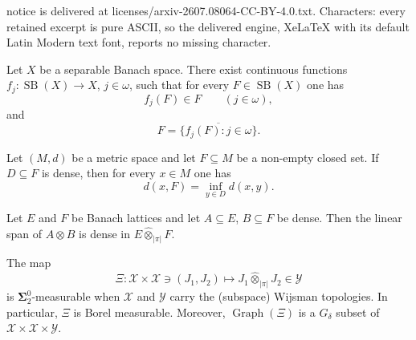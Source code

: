 \documentclass[10pt,a4paper]{amsart}
\DeclareMathOperator{\Graph}{Graph}
\DeclareMathOperator{\SB}{SB}
\begin{document}
notice is delivered at licenses/arxiv-2607.08064-CC-BY-4.0.txt. Characters: every retained excerpt is pure ASCII, so the delivered engine, XeLaTeX with its default Latin Modern text font, reports no missing character.
\begin{theorem}\label{thm:selection}
Let $X$ be a separable Banach space.  There exist continuous functions
$f_j \colon \SB(X) \to X$, $j \in \omega$, such that for every
$F \in \SB(X)$ one has
\[
    f_j(F) \in F \qquad (j \in \omega),
\]
and
\[
    F = \overline{\{f_j(F) \colon j \in \omega\}}.
\]
\end{theorem}

\begin{lemma}\label{lem:dist-dense}
Let $(M, d)$ be a metric space and let $F \subseteq M$ be a non-empty closed set.
If $D \subseteq F$ is dense, then for every $x \in M$ one has
\[
    d(x, F) = \inf_{y \in D} d(x, y).
\]
\end{lemma}

\begin{lemma}\label{lem:dense-tensor}
Let $E$ and $F$ be Banach lattices and let $A \subseteq E$, $B \subseteq F$
be dense.  Then the linear span of $A \otimes B$ is dense in
$E \hat{\otimes}_{|\pi|} F$.
\end{lemma}

\begin{theorem}\label{thm:tensor}
The map
\[
    \Xi \colon \mathscr{X} \times \mathscr{X} \ni (J_1, J_2)
    \longmapsto J_1 \hat{\otimes}_{|\pi|} J_2 \in \mathscr{Y}
\]
is $\boldsymbol{\Sigma}^0_2$-measurable when $\mathscr{X}$ and $\mathscr{Y}$
carry the (subspace) Wijsman topologies.  In particular, $\Xi$ is Borel
measurable.  Moreover, $\Graph(\Xi)$ is a $G_\delta$ subset of
$\mathscr{X} \times \mathscr{X} \times \mathscr{Y}$.
\end{theorem}
\end{document}
